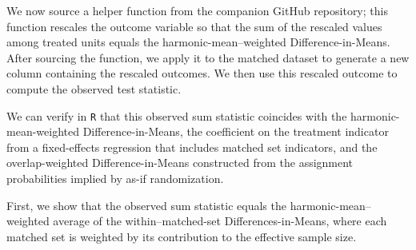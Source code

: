 \documentclass[
  12pt,
  leqno]{article}
\newenvironment{Shaded}{\begin{snugshade}}{\end{snugshade}}
\newcommand{\AttributeTok}[1]{\textcolor[rgb]{0.13,0.29,0.53}{#1}}
\newcommand{\CommentTok}[1]{\textcolor[rgb]{0.56,0.35,0.01}{\textit{#1}}}
\newcommand{\DecValTok}[1]{\textcolor[rgb]{0.00,0.00,0.81}{#1}}
\newcommand{\FunctionTok}[1]{\textcolor[rgb]{0.13,0.29,0.53}{\textbf{#1}}}
\newcommand{\NormalTok}[1]{#1}
\newcommand{\OtherTok}[1]{\textcolor[rgb]{0.56,0.35,0.01}{#1}}
\newcommand{\SpecialCharTok}[1]{\textcolor[rgb]{0.81,0.36,0.00}{\textbf{#1}}}
\newcommand{\StringTok}[1]{\textcolor[rgb]{0.31,0.60,0.02}{#1}}
\begin{document}
\doublespacing

We now source a helper function from the companion GitHub repository;
this function rescales the outcome variable so that the sum of the
rescaled values among treated units equals the harmonic-mean--weighted
Difference-in-Means. After sourcing the function, we apply it to the
matched dataset to generate a new column containing the rescaled
outcomes. We then use this rescaled outcome to compute the observed test
statistic.

\singlespacing

\begin{Shaded}
\end{Shaded}

\doublespacing

We can verify in \texttt{R} that this observed sum statistic coincides
with the harmonic-mean-weighted Difference-in-Means, the coefficient on
the treatment indicator from a fixed-effects regression that includes
matched set indicators, and the overlap-weighted Difference-in-Means
constructed from the assignment probabilities implied by as-if
randomization.

First, we show that the observed sum statistic equals the
harmonic-mean--weighted average of the within--matched-set
Differences-in-Means, where each matched set is weighted by its
contribution to the effective sample size.
\end{document}
